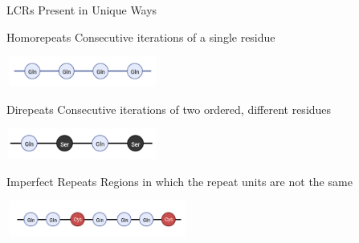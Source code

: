 \documentclass{beamer}
\begin{document}
	\begin{frame}{LCRs Present in Unique Ways }
		
		\begin{alertblock}{Homorepeats}
			Consecutive iterations of a single residue
		\end{alertblock}
	
		\begin{center}
			\includegraphics[width=5cm, height=1cm]{poyglut.png}
		\end{center}
	
		\begin{alertblock}{Direpeats}
			Consecutive iterations of two ordered, different residues
		\end{alertblock}
	
		\begin{center}
			\includegraphics[width=5cm, height=1cm]{direpeat.png}
		\end{center}

		\begin{alertblock}{Imperfect Repeats}
			Regions in which the repeat units are not the same
		\end{alertblock}
	
		\begin{center}
			\includegraphics[width=6cm, height=1.2cm]{imperfect.png}
		\end{center}
	
	\end{frame}
\end{document}
